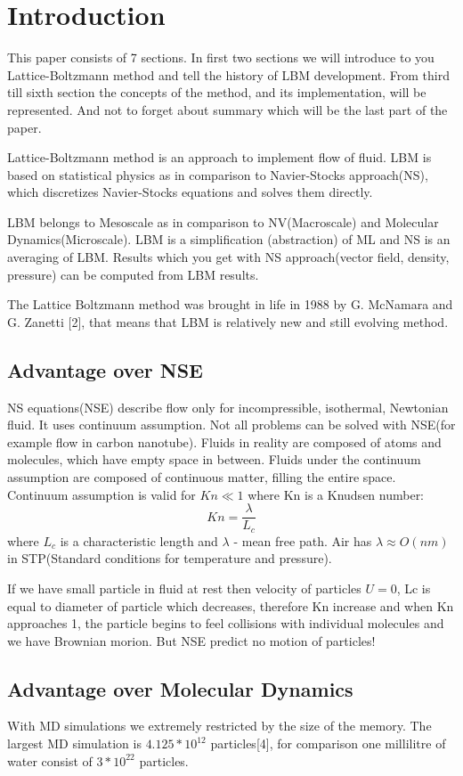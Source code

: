 
\section{Introduction}

This paper consists of 7 sections. In first two sections we will introduce to you Lattice-Boltzmann method and tell the history of LBM development. From third till sixth section the concepts of the method, and its implementation, will be represented. And not to forget about summary which will be the last part of the paper.

Lattice-Boltzmann method is an approach to implement flow of fluid. LBM is based on statistical physics as in comparison to Navier-Stocks approach(NS), which discretizes Navier-Stocks equations and solves them directly.

LBM belongs to Mesoscale as in comparison to NV(Macroscale) and Molecular Dynamics(Microscale). LBM is a simplification (abstraction) of ML and NS is an averaging of LBM. Results which you get with NS approach(vector field, density, pressure) can be computed from LBM results.

The Lattice Boltzmann method was brought in life in 1988 by G. McNamara and G. Zanetti [2],  that means that LBM is relatively new and still evolving method.

\subsection{Advantage over NSE}

NS equations(NSE) describe flow only for incompressible, isothermal, Newtonian fluid. It uses continuum assumption. Not all problems can be solved with NSE(for example flow in carbon nanotube). Fluids in reality are composed of atoms and molecules, which have empty space in between. Fluids under the continuum assumption are composed of continuous matter, filling the entire space. Continuum assumption is valid for $Kn \ll 1$ where Kn is a Knudsen number:
\begin{equation}
Kn=\frac{\lambda}{L_c}
\end{equation}
where $L_c$ is a characteristic length and $\lambda$ - mean free path. Air has $\lambda \approx O(nm)$ in STP(Standard conditions for temperature and pressure).

If we have small particle in fluid at rest then velocity of particles $U=0$, Lc is equal to diameter of particle which decreases, therefore Kn increase and when Kn approaches 1, the particle begins to feel collisions with individual molecules and we have Brownian morion. But NSE predict no motion of particles!

\subsection{Advantage over Molecular Dynamics}
With MD simulations we extremely restricted by the size of the memory. The largest MD simulation is $4.125*10^{12}$ particles[4], for comparison one millilitre of water consist of $3*10^{22}$ particles.